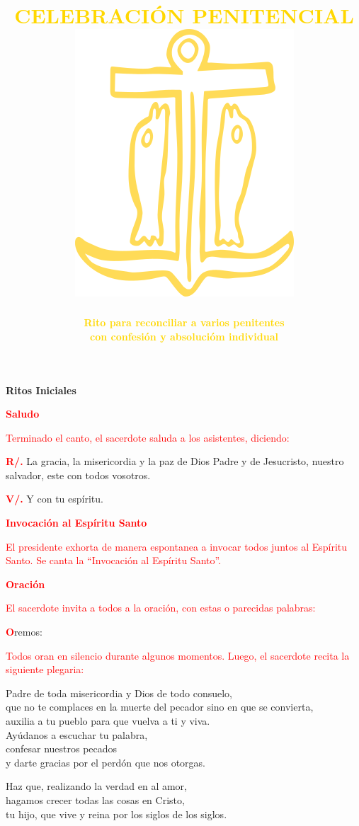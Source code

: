 \documentclass[12pt, letterpaper]{report}
\title{
	\Huge {\bfseries \textcolor{gold}{CELEBRACI\'ON PENITENCIAL}} \\
	\vspace{2em}
	\includegraphics{ancla}
}
\author{
	\large {\bfseries \textcolor{gold}{Rito para reconciliar a varios penitentes}}\\ 
	\large {\bfseries \textcolor{gold}{con confesi\'on y absoluci\'om individual}}
}
\date{ }
\begin{document}
\pagecolor{red}\afterpage{\nopagecolor}
\maketitle

\begin{center}
\Huge {\bfseries Ritos Iniciales}
\end{center}

\Large {\bfseries \textcolor{red}{Saludo}}

\large {\textcolor{red}{ Terminado el canto, el sacerdote saluda a los asistentes, diciendo:}}

\noindent
\Large {\bfseries \textcolor{red}{R/.}} \hspace{0.5cm} {La gracia, la misericordia y la paz de Dios Padre y de Jesucristo, nuestro salvador, este con todos vosotros.}

\noindent
\Large{{\bfseries \textcolor{red}{V/.}} \hspace{0.5cm} Y con tu esp\'iritu.}

\Large {\bfseries \textcolor{red}{Invocaci\'on al Esp\'iritu Santo}}

\large {\textcolor{red}{El presidente exhorta de manera espontanea a invocar todos juntos al Esp\'iritu Santo. Se canta la ``Invocaci\'on al Esp\'iritu Santo''.}}

\Large {\bfseries \textcolor{red}{Oraci\'on}}

\large {\textcolor{red}{El sacerdote invita a todos a la oraci\'on, con estas o parecidas palabras:}}

\lettrine[lines=1]{\bfseries \textcolor{red}{O}}{}\Large {remos:}

\large {\textcolor{red}{Todos oran en silencio durante algunos momentos. Luego, el sacerdote recita la siguiente plegaria:}}

\noindent
\Large {Padre de toda misericordia y Dios de todo consuelo, \\
que no te complaces en la muerte del pecador sino en que se convierta,\\
auxilia a tu pueblo para que vuelva a ti y viva.\\
Ay\'udanos a escuchar tu palabra,\\
confesar nuestros pecados\\
y darte gracias por el perd\'on que nos otorgas.}

\newpage

\noindent
\Large {Haz que, realizando la verdad en al amor,\\
hagamos crecer todas las cosas en Cristo,\\
tu hijo, que vive y reina por los siglos de los siglos.}
\end{document}
